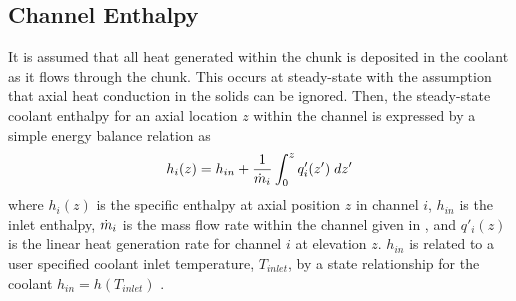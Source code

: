   \subsection{Channel Enthalpy}
    It is assumed that all heat generated within the chunk is deposited in the
    coolant as it flows through the chunk. This occurs at steady-state with the
    assumption that axial heat conduction in the solids can be ignored. Then, 
    the steady-state coolant enthalpy for an axial location $z$ within the 
    channel is expressed by a simple energy balance relation as
    \begin{equation}
      \label{eq:continuous_heat_balance}
      h_i(z) = h_{in} + \frac{1}{\dot{m}_i} \int_0^z q'_i(z') \; dz'
    \end{equation}
    where $h_i(z)$ is the specific enthalpy at axial position $z$ in channel
    $i$, $h_{in}$ is the inlet enthalpy, $\dot{m}_i$ is the mass flow rate within
    the channel given in , and $q'_i(z)$ is the linear
    heat generation rate for channel $i$ at elevation $z$. $h_{in}$ is related
    to a user specified coolant inlet temperature, $T_{inlet}$, by a state
    relationship for the coolant $h_{in} = h(T_{inlet})$ \cite{sodiumProp}. 

